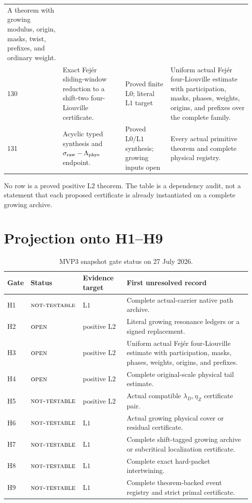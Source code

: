 \documentclass[11pt]{article}
\theoremstyle{definition}
\theoremstyle{remark}
\newcommand{\NT}{\textnormal{\textsc{not-testable}}}
\newcommand{\OPEN}{\textnormal{\textsc{open}}}
\newcommand{\Lzero}{\mathrm{L0}}
\newcommand{\Lone}{\mathrm{L1}}
\newcommand{\Ltwo}{\mathrm{L2}}
\begin{document}
\begin{table}[htbp]
\begin{tabularx}{\textwidth}{@{}P{0.055\textwidth}P{0.43\textwidth}
P{0.15\textwidth}Y@{}}
A theorem with growing modulus, origin, masks, twist, prefixes, and
ordinary weight.\\
130 & Exact Fej\'er sliding-window reduction to a shift-two
four-Liouville certificate. &
Proved finite \(\Lzero\); literal \(\Lone\) target &
Uniform actual Fej\'er four-Liouville estimate with participation,
masks, phases, weights, origins, and prefixes over the complete
family.\\
131 & Acyclic typed synthesis and
\(\sigma_{\rm raw}-\Lambda_{\rm phys}\) endpoint. &
Proved \(\Lzero/\Lone\) synthesis; growing inputs open &
Every actual primitive theorem and complete physical registry.\\
\bottomrule
\end{tabularx}
\end{table}

No row is a proved positive \(\Ltwo\) theorem.  The table is a
dependency audit, not a statement that each proposed certificate is
already instantiated on a complete growing archive.

\section{Projection onto H1--H9}

\begin{table}[htbp]
\centering
\small
\caption{MVP3 snapshot gate status on 27 July 2026.}
\label{tab:gates}
\begin{tabularx}{\textwidth}{@{}P{0.07\textwidth}P{0.17\textwidth}
P{0.16\textwidth}Y@{}}
\toprule
Gate & Status & Evidence target & First unresolved record\\
\midrule
H1 & \(\NT\) & \(\Lone\) & Complete actual-carrier native path
archive.\\
H2 & \(\OPEN\) & positive \(\Ltwo\) & Literal growing resonance
ledgers or a signed replacement.\\
H3 & \(\OPEN\) & positive \(\Ltwo\) & Uniform actual Fej\'er
four-Liouville estimate with participation, masks, phases, weights,
origins, and prefixes.\\
H4 & \(\OPEN\) & positive \(\Ltwo\) & Complete original-scale physical
tail estimate.\\
H5 & \(\NT\) & positive \(\Ltwo\) & Actual compatible
\(\lambda_D,\eta_Z\) certificate pair.\\
H6 & \(\NT\) & \(\Lone\) & Actual growing physical cover or residual
certificate.\\
H7 & \(\NT\) & \(\Lone\) & Complete shift-tagged growing archive or
subcritical localization certificate.\\
H8 & \(\NT\) & \(\Lone\) & Complete exact hard-packet
intertwining.\\
H9 & \(\NT\) & \(\Lone\) & Complete theorem-backed event registry and
strict primal certificate.\\
\bottomrule
\end{tabularx}
\end{table}
\end{document}
